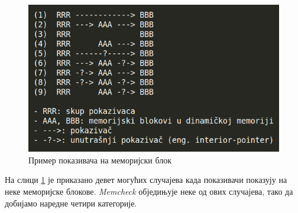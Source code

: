 \documentclass[12pt,oneside]{memoir}
\begin{document}
\begin{figure}[h!]
\begin{center}
\includegraphics[scale=0.75]{slika7.png}
\end{center}
\caption{Пример показивача на меморијски блок}
\label{fig:memblok}
\end{figure}

\indent На слици \ref{fig:memblok} је приказано девет могућих случајева када показивачи показују на неке меморијске блокове. \textit{Memcheck} обједињује неке од ових случајева, тако да добијамо наредне четири категорије.
\end{document}
